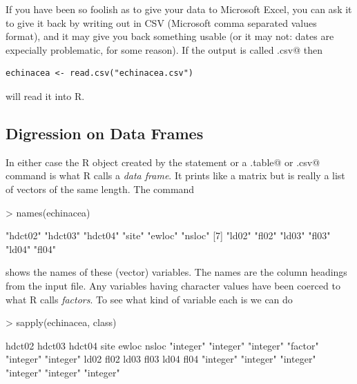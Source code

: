 \documentclass[11pt]{article}
\begin{document}
If you have been so foolish as to give your data to Microsoft Excel,
you can ask it to give it back by writing out in CSV (Microsoft
comma separated values format), and it may give you back something usable
(or it may not: dates are expecially problematic, for some reason).
If the output is called \verb@echinacea.csv@ then
\begin{verbatim}
echinacea <- read.csv("echinacea.csv")
\end{verbatim}
will read it into R.

\subsection{Digression on Data Frames}

In either case the R object \verb@echinacea@ created by the \verb@data@
statement or a \verb@read.table@
or \verb@read.csv@ command is what R calls a \emph{data frame}.  It prints like
a matrix but is really a list of vectors of the same length.  The command
\begin{Schunk}
\begin{Sinput}
> names(echinacea)
\end{Sinput}
\begin{Soutput}
 [1] "hdct02" "hdct03" "hdct04" "site"   "ewloc"  "nsloc" 
 [7] "ld02"   "fl02"   "ld03"   "fl03"   "ld04"   "fl04"  
\end{Soutput}
\end{Schunk}
shows the names of these (vector) variables.  The names are the column
headings from the input file.  Any variables having character values
have been coerced to what R calls \emph{factors}.  To see what kind of
variable each is we can do
\begin{Schunk}
\begin{Sinput}
> sapply(echinacea, class)
\end{Sinput}
\begin{Soutput}
   hdct02    hdct03    hdct04      site     ewloc     nsloc 
"integer" "integer" "integer"  "factor" "integer" "integer" 
     ld02      fl02      ld03      fl03      ld04      fl04 
"integer" "integer" "integer" "integer" "integer" "integer" 
\end{Soutput}
\end{Schunk}
\end{document}
